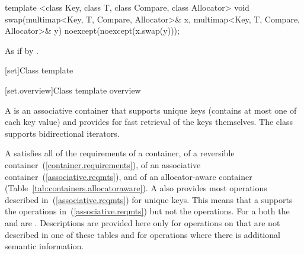 %
\begin{itemdecl}
template <class Key, class T, class Compare, class Allocator>
  void swap(multimap<Key, T, Compare, Allocator>& x,
            multimap<Key, T, Compare, Allocator>& y)
    noexcept(noexcept(x.swap(y)));
\end{itemdecl}

\begin{itemdescr}
\pnum
\effects
As if by .
\end{itemdescr}

[set]{Class template }

[set.overview]{Class template  overview}

\pnum
{}%
A
is an associative container that supports unique keys (contains at most one of each key value) and
provides for fast retrieval of the keys themselves.
The
 class
supports bidirectional iterators.

\pnum
A  satisfies all of the requirements of a container, of a reversible
container~(\ref{container.requirements}), of an associative
container~(\ref{associative.reqmts}), and of an allocator-aware container
(Table~\ref{tab:containers.allocatoraware}).
A
also provides most operations described in~(\ref{associative.reqmts})
for unique keys.
This means that a
supports the
operations in~(\ref{associative.reqmts})
but not the
operations.
For a
both the
and
are
.
Descriptions are provided here only for operations on
that are not described in one of these tables
and for operations where there is additional semantic information.

